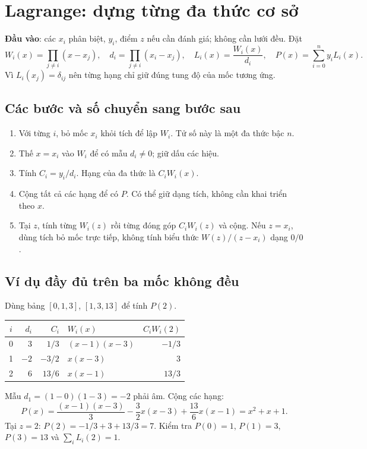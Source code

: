 \section{Lagrange: dựng từng đa thức cơ sở}
\label{sec:lagrange}
\textbf{Đầu vào}: các $x_i$ phân biệt, $y_i$, điểm $z$ nếu cần đánh giá; không cần lưới đều. Đặt
\[
 W_i(x)=\prod_{j\ne i}(x-x_j),\quad
 d_i=\prod_{j\ne i}(x_i-x_j),\quad
 L_i(x)=\frac{W_i(x)}{d_i},\quad
 P(x)=\sum_{i=0}^ny_iL_i(x).
\]
Vì $L_i(x_j)=\delta_{ij}$ nên từng hạng chỉ giữ đúng tung độ của mốc tương ứng.

\subsection{Các bước và số chuyển sang bước sau}
\begin{enumerate}
\item Với từng $i$, bỏ mốc $x_i$ khỏi tích để lập $W_i$. Tử số này là một đa thức bậc $n$.
\item Thế $x=x_i$ vào $W_i$ để có mẫu $d_i\ne0$; giữ dấu các hiệu.
\item Tính $C_i=y_i/d_i$. Hạng của đa thức là $C_iW_i(x)$.
\item Cộng tất cả các hạng để có $P$. Có thể giữ dạng tích, không cần khai triển theo $x$.
\item Tại $z$, tính từng $W_i(z)$ rồi từng đóng góp $C_iW_i(z)$ và cộng. Nếu $z=x_i$, dùng tích bỏ mốc trực tiếp, không tính biểu thức $W(z)/(z-x_i)$ dạng $0/0$.
\end{enumerate}

\subsection{Ví dụ đầy đủ trên ba mốc không đều}
Dùng bảng $[0,1,3]$, $[1,3,13]$ để tính $P(2)$.
\begin{center}\small
\begin{tabular}{@{}crrlr@{}}\toprule
$i$ & $d_i$ & $C_i$ & $W_i(x)$ & $C_iW_i(2)$\\\midrule
0 & 3 & $1/3$ & $(x-1)(x-3)$ & $-1/3$\\
1 & $-2$ & $-3/2$ & $x(x-3)$ & $3$\\
2 & 6 & $13/6$ & $x(x-1)$ & $13/3$\\\bottomrule
\end{tabular}\end{center}
Mẫu $d_1=(1-0)(1-3)=-2$ phải âm. Cộng các hạng:
\[
 P(x)=\frac{(x-1)(x-3)}3-\frac32x(x-3)+\frac{13}6x(x-1)
     =x^2+x+1.
\]
Tại $z=2$: $P(2)=-1/3+3+13/3=7$. Kiểm tra $P(0)=1$, $P(1)=3$, $P(3)=13$ và $\sum_iL_i(2)=1$.

